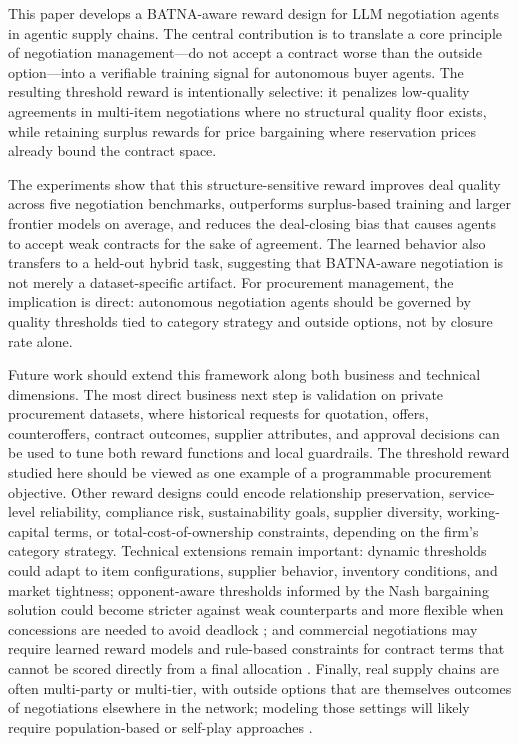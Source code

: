 \documentclass{interact}
\theoremstyle{plain}
\theoremstyle{definition}
\theoremstyle{remark}
\begin{document}
This paper develops a BATNA-aware reward design for LLM negotiation agents in agentic supply chains. The central contribution is to translate a core principle of negotiation management---do not accept a contract worse than the outside option---into a verifiable training signal for autonomous buyer agents. The resulting threshold reward is intentionally selective: it penalizes low-quality agreements in multi-item negotiations where no structural quality floor exists, while retaining surplus rewards for price bargaining where reservation prices already bound the contract space.

The experiments show that this structure-sensitive reward improves deal quality across five negotiation benchmarks, outperforms surplus-based training and larger frontier models on average, and reduces the deal-closing bias that causes agents to accept weak contracts for the sake of agreement. The learned behavior also transfers to a held-out hybrid task, suggesting that BATNA-aware negotiation is not merely a dataset-specific artifact. For procurement management, the implication is direct: autonomous negotiation agents should be governed by quality thresholds tied to category strategy and outside options, not by closure rate alone.

Future work should extend this framework along both business and technical dimensions. The most direct business next step is validation on private procurement datasets, where historical requests for quotation, offers, counteroffers, contract outcomes, supplier attributes, and approval decisions can be used to tune both reward functions and local guardrails. The threshold reward studied here should be viewed as one example of a programmable procurement objective. Other reward designs could encode relationship preservation, service-level reliability, compliance risk, sustainability goals, supplier diversity, working-capital terms, or total-cost-of-ownership constraints, depending on the firm's category strategy. Technical extensions remain important: dynamic thresholds could adapt to item configurations, supplier behavior, inventory conditions, and market tightness; opponent-aware thresholds informed by the Nash bargaining solution could become stricter against weak counterparts and more flexible when concessions are needed to avoid deadlock \cite{nash1950bargaining}; and commercial negotiations may require learned reward models and rule-based constraints for contract terms that cannot be scored directly from a final allocation \cite{zeng2025repo}. Finally, real supply chains are often multi-party or multi-tier, with outside options that are themselves outcomes of negotiations elsewhere in the network; modeling those settings will likely require population-based or self-play approaches \cite{liu2025spiral}.
\end{document}
